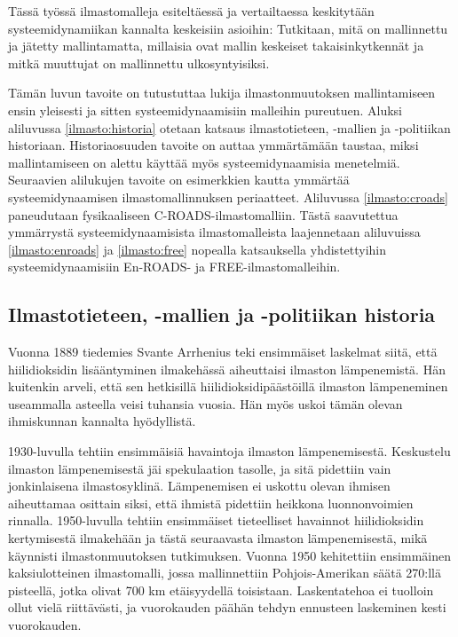 \documentclass[finnish,12pt,a4paper,pdftex]{article}
\begin{document}
\begin{onehalfspacing}
Tässä työssä ilmastomalleja esiteltäessä ja vertailtaessa keskitytään systeemidynamiikan kannalta keskeisiin asioihin: Tutkitaan, mitä on mallinnettu ja jätetty mallintamatta, millaisia ovat mallin keskeiset takaisinkytkennät ja mitkä muuttujat on mallinnettu ulkosyntyisiksi. 

Tämän luvun tavoite on tutustuttaa lukija ilmastonmuutoksen mallintamiseen ensin yleisesti ja sitten systeemidynaamisiin malleihin pureutuen. Aluksi aliluvussa \ref{ilmasto:historia} otetaan katsaus ilmastotieteen, -mallien ja -politiikan historiaan. Historiaosuuden tavoite on auttaa ymmärtämään taustaa, miksi mallintamiseen on alettu käyttää myös systeemidynaamisia menetelmiä. Seuraavien alilukujen tavoite on esimerkkien kautta ymmärtää systeemidynaamisen ilmastomallinnuksen periaatteet. Aliluvussa \ref{ilmasto:croads} paneudutaan fysikaaliseen C-ROADS-ilmastomalliin. Tästä saavutettua ymmärrystä systeemidynaamisista ilmastomalleista laajennetaan aliluvuissa \ref{ilmasto:enroads} ja \ref{ilmasto:free} nopealla katsauksella yhdistettyihin systeemidynaamisiin En-ROADS- ja FREE-ilmastomalleihin.

\subsection{Ilmastotieteen, -mallien ja -politiikan historia \label{ilmasto:historia}}

Vuonna 1889 tiedemies Svante Arrhenius teki ensimmäiset laskelmat siitä, että hiilidioksidin lisääntyminen ilmakehässä aiheuttaisi ilmaston lämpenemistä. Hän kuitenkin arveli, että sen hetkisillä hiilidioksidipäästöillä ilmaston lämpeneminen useammalla asteella veisi tuhansia vuosia. Hän myös uskoi tämän olevan ihmiskunnan kannalta hyödyllistä. \cite{AmericanInstituteofPhysicsSimple}

1930-luvulla tehtiin ensimmäisiä havaintoja ilmaston lämpenemisestä. Keskustelu ilmaston lämpenemisestä jäi spekulaation tasolle, ja sitä pidettiin vain jonkinlaisena ilmastosyklinä. Lämpenemisen ei uskottu olevan ihmisen aiheuttamaa osittain siksi, että ihmistä pidettiin heikkona luonnonvoimien rinnalla. 1950-luvulla tehtiin ensimmäiset tieteelliset havainnot hiilidioksidin kertymisestä ilmakehään ja tästä seuraavasta ilmaston lämpenemisestä, mikä käynnisti ilmastonmuutoksen tutkimuksen. \cite{AmericanInstituteofPhysics} Vuonna 1950 kehitettiin ensimmäinen kaksiulotteinen ilmastomalli, jossa mallinnettiin Pohjois-Amerikan säätä 270:llä pisteellä, jotka olivat 700 km etäisyydellä toisistaan. Laskentatehoa ei tuolloin ollut vielä riittävästi, ja vuorokauden päähän tehdyn ennusteen laskeminen kesti vuorokauden. \cite{AmericanInstituteofPhysicsGCM}


\end{onehalfspacing}
\end{document}
